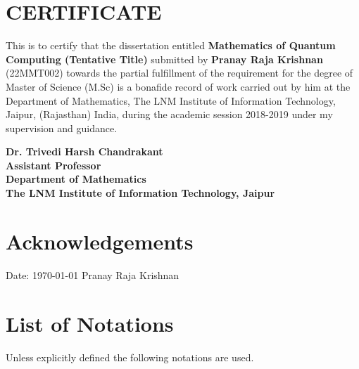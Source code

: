 \documentclass[12pt,twoside]{report}
\begin{document}
\renewcommand{\sectionmark}[1]{\markright{#1}}

\chapter*{\centering CERTIFICATE}

This is to certify that the dissertation entitled \textbf{Mathematics of Quantum Computing (Tentative Title)} submitted by \textbf{Pranay Raja Krishnan} (22MMT002) towards the partial fulfillment of the requirement for the degree of Master of Science (M.Sc) is a bonafide record of work carried out by him at the Department of Mathematics, The LNM Institute of Information Technology, Jaipur, (Rajasthan) India, during the academic session 2018-2019 under my supervision and guidance. \\
\vspace*{3cm}
\begin{flushright}
	\hfill
	{\parbox{7cm}{\textbf{Dr. Trivedi Harsh Chandrakant\\
	Assistant Professor\\
	Department of Mathematics\\
	The LNM Institute of Information Technology, Jaipur}}}
\end{flushright}

\chapter*{\centering Acknowledgements}

\lipsum[2]


\vspace*{3cm}
Date: \today
\hfill{}
Pranay Raja Krishnan

\chapter*{List of Notations}
Unless explicitly defined the following notations are used.\\
\end{document}
